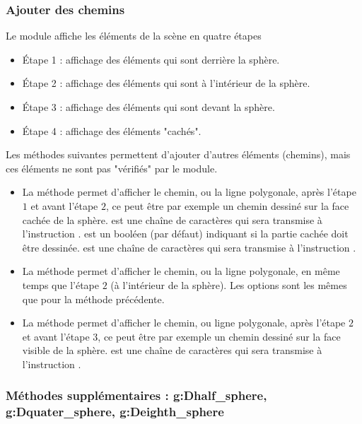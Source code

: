 \subsubsection{Ajouter des chemins}

Le module affiche les éléments de la scène en quatre étapes
\begin{itemize}
    \item Étape 1 : affichage des éléments qui sont derrière la sphère.
    \item Étape 2 : affichage des éléments qui sont à l'intérieur de  la sphère.
    \item Étape 3 : affichage des éléments qui sont devant la sphère.
    \item Étape 4 : affichage des éléments "cachés".
\end{itemize}

Les méthodes suivantes permettent d'ajouter d'autres éléments (chemins), mais ces éléments ne sont pas "vérifiés" par le module.
\begin{itemize}
    \item La méthode  permet d'afficher le chemin, ou la ligne polygonale,  après l'étape $1$ et avant l'étape $2$, ce peut être par exemple un chemin dessiné sur la face cachée de la sphère.  est une chaîne de caractères qui sera transmise à l'instruction \drawcmd.  est un booléen (\false par défaut) indiquant si la partie cachée doit être dessinée.  est une chaîne de caractères qui sera transmise à l'instruction \drawcmd.
    
    \item La méthode  permet d'afficher le chemin, ou la ligne polygonale,  en même temps que l'étape $2$ (à l'intérieur de la sphère). Les options sont les mêmes que pour la méthode précédente.
    
    \item La méthode  permet d'afficher le chemin, ou ligne polygonale,  après l'étape $2$ et avant l'étape $3$, ce peut être par exemple un chemin dessiné sur la face visible de la sphère.  est une chaîne de caractères qui sera transmise à l'instruction \drawcmd.
\end{itemize}

\subsubsection{Méthodes supplémentaires : g:Dhalf\_sphere, g:Dquater\_sphere, g:Deighth\_sphere}

